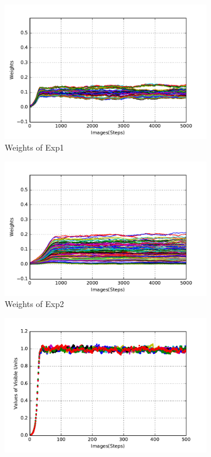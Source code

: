 \begin{figure}
	\centering
	\begin{subfigure}[t]{0.4\textwidth}
		\includegraphics[width=\textwidth]{pics_sdlm/30_exp_RBM/exp1_weights_non.pdf}
		\caption{Weights of Exp1}
	\end{subfigure}
	\begin{subfigure}[t]{0.4\textwidth}
		\includegraphics[width=\textwidth]{pics_sdlm/30_exp_RBM/exp2_weights_non.pdf}
		\caption{Weights of Exp2}
	\end{subfigure}
	\begin{subfigure}[t]{0.4\textwidth}
		\includegraphics[width=\textwidth]{pics_sdlm/30_exp_RBM/exp1_recon_non.pdf}

\end{subfigure}
\end{figure}
